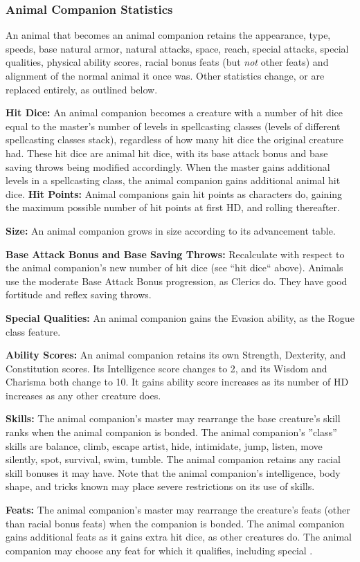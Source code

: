 \subsubsection{Animal Companion Statistics}
An animal that becomes an animal companion retains the appearance, type, speeds, base natural armor, natural attacks, space, reach, special attacks, special qualities, 
physical ability scores, racial bonus feats (but \emph{not} other feats) and alignment of the normal animal it once was. 
Other statistics change, or are replaced entirely, as outlined below.
\begin{list}{}{\leftmargin=1em}
 \item \textbf{Hit Dice:} An animal companion becomes a creature with a number of hit dice equal to the master's number of levels in spellcasting classes 
 (levels of different spellcasting classes stack), 
 regardless of how many hit dice the original creature had. 
 These hit dice are animal hit dice, with its base attack bonus and base saving throws being modified accordingly.
 When the master gains additional levels in a spellcasting class, the animal companion gains additional animal hit dice. 
 \subitem \textbf{Hit Points:} Animal companions gain hit points as characters do, gaining the maximum possible number of hit points at first HD, 
 and rolling thereafter.
 \item \textbf{Size:} An animal companion grows in size according to its advancement table.
 \item \textbf{Base Attack Bonus and Base Saving Throws:} Recalculate with respect to the animal companion's new number of hit dice (see ``hit dice`` above). 
 Animals use the moderate Base Attack Bonus progression, as Clerics do. They have good fortitude and reflex saving throws.
 \item \textbf{Special Qualities:} An animal companion gains the Evasion ability, as the Rogue class feature.
 \item \textbf{Ability Scores:} An animal companion retains its own Strength, Dexterity, and Constitution scores. 
 Its Intelligence score changes to 2, and its Wisdom and Charisma both change to 10.
 It gains ability score increases as its number of HD increases as any other creature does.
 \item \textbf{Skills:} The animal companion's master may rearrange the base creature's skill ranks when the animal companion is bonded. 
 The animal companion's ''class'' skills are balance, climb, escape artist, hide, intimidate, jump, listen, move silently, spot, survival, swim, tumble. 
 The animal companion retains any racial skill bonuses it may have.
 Note that the animal companion's intelligence, body shape, and tricks known may place severe restrictions on its use of skills.
 \item \textbf{Feats:} The animal companion's master may rearrange the creature's feats (other than racial bonus feats) when the companion is bonded.
 The animal companion gains additional feats as it gains extra hit dice, as other creatures do. 
 The animal companion may choose any feat for which it qualifies, including special .
\end{list}
